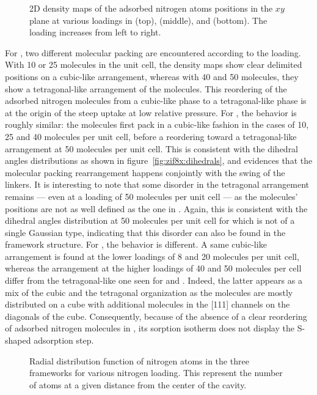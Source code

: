 \documentclass[thesis]{subfiles}
\begin{document}
\begin{figure}[ht]
    \centering
    
    \caption{2D density maps of the adsorbed nitrogen atoms positions in the $xy$
    plane at various loadings in  (top), \ZIFCl (middle), and \ZIFBr
    (bottom). The loading increases from left to right.}
    \label{fig:zif8x:density}
\end{figure}

For , two different molecular packing are encountered according to the
loading. With 10 or 25 molecules in the unit cell, the density maps show clear
delimited positions on a cubic-like arrangement, whereas with 40 and 50
molecules, they show a tetragonal-like arrangement of the molecules. This
reordering of the adsorbed nitrogen molecules from a cubic-like phase to a
tetragonal-like phase is at the origin of the steep uptake at low relative
pressure. For \ZIFCl, the behavior is roughly similar: the molecules first pack
in a cubic-like fashion in the cases of 10, 25 and 40 molecules per unit cell,
before a reordering toward a tetragonal-like arrangement at 50 molecules per
unit cell. This is consistent with the dihedral angles distributions as shown in
figure~\ref{fig:zif8x:dihedrals}, and evidences that the molecular packing
rearrangement happens conjointly with the swing of the linkers. It is
interesting to note that some disorder in the tetragonal arrangement remains ---
even at a loading of 50 molecules per unit cell --- as the molecules' positions
are not as well defined as the one in . Again, this is consistent with the
dihedral angles distribution at 50 molecules per unit cell for \ZIFCl which is
not of a single Gaussian type, indicating that this disorder can also be found
in the framework structure. For \ZIFBr, the behavior is different. A same
cubic-like arrangement is found at the lower loadings of 8 and 20 molecules per
unit cell, whereas the arrangement at the higher loadings of 40 and 50 molecules
per cell differ from the tetragonal-like one seen for  and \ZIFCl. Indeed,
the latter appears as a mix of the cubic and the tetragonal organization as the
molecules are mostly distributed on a cube with additional molecules in the
[111] channels on the diagonals of the cube. Consequently, because of the
absence of a clear reordering of adsorbed nitrogen molecules in \ZIFBr, its
sorption isotherm does not display the S-shaped adsorption step.

\begin{figure}[ht]
    \centering
    
    \caption{Radial distribution function of nitrogen atoms in the three
    frameworks for various nitrogen loading. This represent the number of atoms
    at a given distance from the center of the cavity.}
    \label{fig:zif8x:rdf}
\end{figure}
\end{document}

